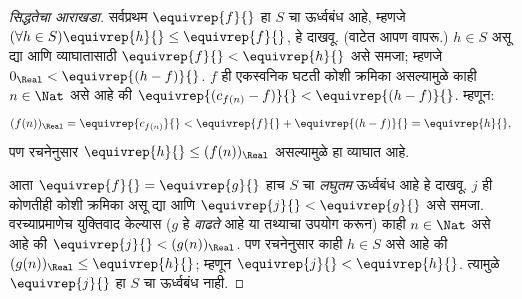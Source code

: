 \documentclass[../../../include/open-logic-section]{subfiles}
\begin{document}
\begin{proof}[सिद्धतेचा आराखडा]
सर्वप्रथम $\equivrep{f}{}$ हा $S$ चा ऊर्ध्वबंध आहे, म्हणजे
$(\forall h \in S)\equivrep{h}{} \leq \equivrep{f}{}$, हे दाखवू.
(वाटेत आपण  वापरू.) $h \in S$ असू द्या
आणि व्याघातासाठी $\equivrep{f}{} < \equivrep{h}{}$ असे समजा; म्हणजे
$0_\Real < \equivrep{(h-f)}{}$. $f$ ही एकस्वनिक घटती कोशी क्रमिका
असल्यामुळे काही $n \in \Nat$ असे आहे की
$\equivrep{(c_{f(n)} - f)}{} < \equivrep{(h-f)}{}$. म्हणून:
\[
	(f(n))_\Real = \equivrep{c_{f(n)}}{} < \equivrep{f}{} + \equivrep{(h-f)}{} = \equivrep{h}{},
\]
पण रचनेनुसार $\equivrep{h}{} \leq (f(n))_\Real$ असल्यामुळे हा
व्याघात आहे.

आता $\equivrep{f}{} = \equivrep{g}{}$ हाच $S$ चा \emph{लघुतम}
ऊर्ध्वबंध आहे हे दाखवू. $j$ ही कोणतीही कोशी क्रमिका असू द्या आणि
$\equivrep{j}{} < \equivrep{g}{}$ असे समजा. वरच्याप्रमाणेच युक्तिवाद
केल्यास ($g$ हे \emph{वाढते} आहे या तथ्याचा उपयोग करून) काही $n \in
\Nat$ असे आहे की $\equivrep{j}{} < (g(n))_\Real$. पण रचनेनुसार काही
$h \in S$ असे आहे की $(g(n))_\Real \leq \equivrep{h}{}$; म्हणून
$\equivrep{j}{} < \equivrep{h}{}$. त्यामुळे $\equivrep{j}{}$ हा
$S$ चा ऊर्ध्वबंध नाही.
\end{proof}
\end{document}
